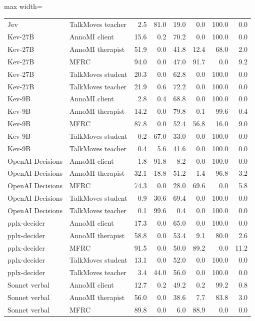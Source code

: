 \begin{table}[t]
\begin{adjustbox}{max width=\linewidth}
\begin{tabular}{llrrrrrr}
Jev & TalkMoves teacher & 2.5 & 81.0 & 19.0 & 0.0 & 100.0 & 0.0 \\
Kev-27B & AnnoMI client & 15.6 & 0.2 & 70.2 & 0.0 & 100.0 & 0.0 \\
Kev-27B & AnnoMI therapist & 51.9 & 0.0 & 41.8 & 12.4 & 68.0 & 2.0 \\
Kev-27B & MFRC & 94.0 & 0.0 & 47.0 & 91.7 & 0.0 & 9.2 \\
Kev-27B & TalkMoves student & 20.3 & 0.0 & 62.8 & 0.0 & 100.0 & 0.0 \\
Kev-27B & TalkMoves teacher & 21.9 & 0.6 & 72.2 & 0.0 & 100.0 & 0.0 \\
Kev-9B & AnnoMI client & 2.8 & 0.4 & 68.8 & 0.0 & 100.0 & 0.0 \\
Kev-9B & AnnoMI therapist & 14.2 & 0.0 & 79.8 & 0.1 & 99.6 & 0.4 \\
Kev-9B & MFRC & 87.8 & 0.0 & 52.4 & 56.8 & 16.0 & 9.0 \\
Kev-9B & TalkMoves student & 0.2 & 67.0 & 33.0 & 0.0 & 100.0 & 0.0 \\
Kev-9B & TalkMoves teacher & 0.4 & 5.6 & 41.6 & 0.0 & 100.0 & 0.0 \\
OpenAI Decisions & AnnoMI client & 1.8 & 91.8 & 8.2 & 0.0 & 100.0 & 0.0 \\
OpenAI Decisions & AnnoMI therapist & 32.1 & 18.8 & 51.2 & 1.4 & 96.8 & 3.2 \\
OpenAI Decisions & MFRC & 74.3 & 0.0 & 28.0 & 69.6 & 0.0 & 5.8 \\
OpenAI Decisions & TalkMoves student & 0.9 & 30.6 & 69.4 & 0.0 & 100.0 & 0.0 \\
OpenAI Decisions & TalkMoves teacher & 0.1 & 99.6 & 0.4 & 0.0 & 100.0 & 0.0 \\
pplx-decider & AnnoMI client & 17.3 & 0.0 & 65.0 & 0.0 & 100.0 & 0.0 \\
pplx-decider & AnnoMI therapist & 58.8 & 0.0 & 53.4 & 9.1 & 80.0 & 2.6 \\
pplx-decider & MFRC & 91.5 & 0.0 & 50.0 & 89.2 & 0.0 & 11.2 \\
pplx-decider & TalkMoves student & 13.1 & 0.0 & 52.0 & 0.0 & 100.0 & 0.0 \\
pplx-decider & TalkMoves teacher & 3.4 & 44.0 & 56.0 & 0.0 & 100.0 & 0.0 \\
Sonnet verbal & AnnoMI client & 12.7 & 0.2 & 49.2 & 0.2 & 99.2 & 0.8 \\
Sonnet verbal & AnnoMI therapist & 56.0 & 0.0 & 38.6 & 7.7 & 83.8 & 3.0 \\
Sonnet verbal & MFRC & 89.8 & 0.0 & 6.0 & 88.9 & 0.0 & 0.0 \\

\end{tabular}
\end{adjustbox}
\end{table}

